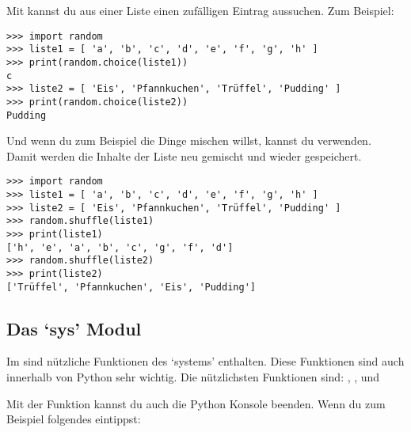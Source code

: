 Mit  kannst du aus einer Liste einen zufälligen Eintrag aussuchen. Zum Beispiel:

\begin{Verbatim}[frame=single]
>>> import random
>>> liste1 = [ 'a', 'b', 'c', 'd', 'e', 'f', 'g', 'h' ]
>>> print(random.choice(liste1))
c
>>> liste2 = [ 'Eis', 'Pfannkuchen', 'Trüffel', 'Pudding' ]
>>> print(random.choice(liste2))
Pudding
\end{Verbatim}

Und wenn du zum Beispiel die Dinge mischen willst, kannst du  verwenden. Damit werden die Inhalte der Liste neu gemischt und wieder gespeichert.

\begin{Verbatim}[frame=single]
>>> import random
>>> liste1 = [ 'a', 'b', 'c', 'd', 'e', 'f', 'g', 'h' ]
>>> liste2 = [ 'Eis', 'Pfannkuchen', 'Trüffel', 'Pudding' ]
>>> random.shuffle(liste1)
>>> print(liste1)
['h', 'e', 'a', 'b', 'c', 'g', 'f', 'd']
>>> random.shuffle(liste2)
>>> print(liste2)
['Trüffel', 'Pfannkuchen', 'Eis', 'Pudding']
\end{Verbatim}

\subsection*{Das `sys' Modul}

Im  sind nützliche Funktionen des `systems' enthalten. Diese Funktionen sind auch innerhalb von Python sehr wichtig. Die nützlichsten Funktionen sind: , ,  und 
\par
Mit der  Funktion kannst du auch die Python Konsole beenden. Wenn du zum Beispiel folgendes eintippst:


